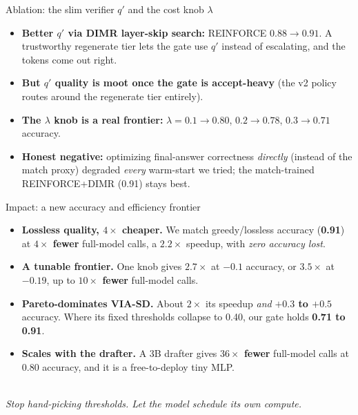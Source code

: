 \documentclass[aspectratio=169,11pt]{beamer}
\begin{document}
\begin{frame}{Ablation: the slim verifier $q'$ and the cost knob $\lambda$}
\begin{itemize}\small
  \item \textbf{Better $q'$ via DIMR layer-skip search:} REINFORCE $0.88 \to 0.91$. A trustworthy regenerate tier lets the gate use $q'$ instead of escalating, and the tokens come out right.
  \item \textbf{But $q'$ quality is moot once the gate is accept-heavy} (the v2 policy routes around the regenerate tier entirely).
  \item \textbf{The $\lambda$ knob is a real frontier:} $\lambda{=}0.1{\to}0.80$, $0.2{\to}0.78$, $0.3{\to}0.71$ accuracy.
  \item \textbf{Honest negative:} optimizing final-answer correctness \emph{directly} (instead of the match proxy) degraded \emph{every} warm-start we tried; the match-trained REINFORCE+DIMR (0.91) stays best.
\end{itemize}
\end{frame}

\begin{frame}{Impact: a new accuracy and efficiency frontier}
\begin{itemize}\small
  \item \textbf{Lossless quality, $4\times$ cheaper.} We match greedy/lossless accuracy (\textbf{0.91}) at \textbf{$4\times$ fewer} full-model calls, a \textbf{$2.2\times$} speedup, with \emph{zero accuracy lost}.
  \item \textbf{A tunable frontier.} One knob gives \textbf{$2.7\times$} at $-0.1$ accuracy, or \textbf{$3.5\times$} at $-0.19$, up to \textbf{$10\times$ fewer} full-model calls.
  \item \textbf{Pareto-dominates VIA-SD.} About \textbf{$2\times$} its speedup \emph{and} \textbf{$+0.3$ to $+0.5$} accuracy. Where its fixed thresholds collapse to 0.40, our gate holds \textbf{0.71 to 0.91}.
  \item \textbf{Scales with the drafter.} A 3B drafter gives \textbf{$36\times$ fewer} full-model calls at 0.80 accuracy, and it is a free-to-deploy tiny MLP.
\end{itemize}
\vspace{1mm}
\centering{}\\[2pt]
\textit{Stop hand-picking thresholds. Let the model schedule its own compute.}
\end{frame}
\end{document}
